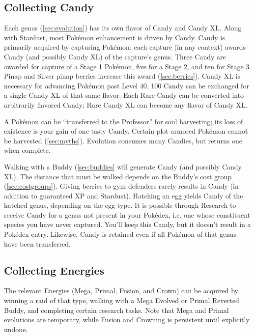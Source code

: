 \subsection{Collecting Candy}
\label{subsec:getcandy}
Each genus (\autoref{sec:evolution}) has its own flavor of Candy and Candy XL.
Along with Stardust, most Pokémon enhancement is driven by Candy.
Candy is primarily acquired by capturing Pokémon: each capture (in any context)
  awards Candy (and possibly Candy XL) of the capture's genus.
Three Candy are awarded for capture of a Stage 1 Pokémon, five for a Stage 2,
  and ten for Stage 3.
Pinap and Silver pinap berries increase this award (\autoref{sec:berries}).
Candy XL is necessary for advancing Pokémon past Level 40.
100 Candy can be exchanged for a single Candy XL of that same flavor.
Each Rare Candy can be converted into arbitrarily flavored Candy; Rare Candy XL can become any flavor of Candy XL\@.

A Pokémon can be ``transferred to the Professor'' for soul harvesting;
  its loss of existence is your gain of one tasty Candy.
Certain plot armored Pokémon cannot be harvested (\autoref{sec:myths}).
Evolution consumes many Candies, but returns one when complete.

Walking with a Buddy (\autoref{sec:buddies} will generate Candy (and possibly Candy XL).
The distance that must be walked depends on the Buddy's cost group (\autoref{sec:costgroups}).
Giving berries to gym defenders rarely results in Candy (in addition to guaranteed XP and Stardust).
Hatching an egg yields Candy of the hatched genus, depending on the egg type.
It is possible through Research to receive Candy for a genus not present in
  your Pokédex, i.e. one whose constituent species you have never captured.
You'll keep this Candy, but it doesn't result in a Pokédex entry.
Likewise, Candy is retained even if all Pokémon of that genus have been transferred.
\subsection{Collecting Energies}
The relevant Energies (Mega, Primal, Fusion, and Crown) can be acquired by winning a raid of that type,
  walking with a Mega Evolved or Primal Reverted Buddy, and completing
  certain research tasks.
Note that Mega and Primal evolutions are temporary, while Fusion and Crowning is persistent
  until explicitly undone.

